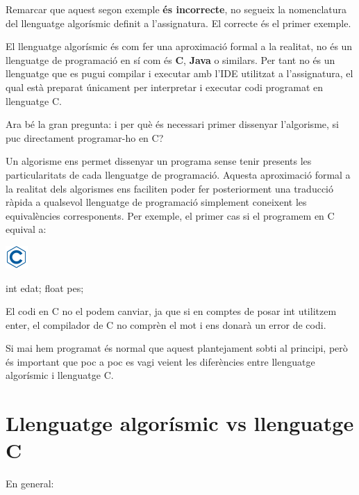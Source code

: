 \documentclass[]{book}
\newenvironment{Shaded}{\begin{snugshade}}{\end{snugshade}}
\newcommand{\DataTypeTok}[1]{\textcolor[rgb]{0.13,0.29,0.53}{#1}}
\newcommand{\NormalTok}[1]{#1}
\begin{document}
Remarcar que aquest segon exemple \textbf{és incorrecte}, no segueix la nomenclatura del llenguatge algorísmic definit a l'assignatura. El correcte és el primer exemple.

El llenguatge algorísmic és com fer una aproximació formal a la realitat, no és un llenguatge de programació en sí com és \textbf{C}, \textbf{Java} o similars. Per tant no és un llenguatge que es pugui compilar i executar amb l'IDE utilitzat a l'assignatura, el qual està preparat únicament per interpretar i executar codi programat en llenguatge C.

Ara bé la gran pregunta: i per què és necessari primer dissenyar l'algorisme, si puc directament programar-ho en C?

Un algorisme ens permet dissenyar un programa sense tenir presents les particularitats de cada llenguatge de programació. Aquesta aproximació formal a la realitat dels algorismes ens faciliten poder fer posteriorment una traducció ràpida a qualsevol llenguatge de programació simplement coneixent les equivalències corresponents. Per exemple, el primer cas si el programem en C equival a:

\includegraphics{./img/c.png}

\begin{Shaded}
\begin{Highlighting}[]
\DataTypeTok{int}\NormalTok{ edat;}
\DataTypeTok{float}\NormalTok{ pes;}
\end{Highlighting}
\end{Shaded}

El codi en C no el podem canviar, ja que si en comptes de posar int utilitzem enter, el compilador de C no comprèn el mot i ens donarà un error de codi.

Si mai hem programat és normal que aquest plantejament sobti al principi, però és important que poc a poc es vagi veient les diferències entre llenguatge algorísmic i llenguatge C.

\hypertarget{llenguatge-algorismic-vs-llenguatge-c}{%
\section{Llenguatge algorísmic vs llenguatge C}\label{llenguatge-algorismic-vs-llenguatge-c}}

En general:
\end{document}

